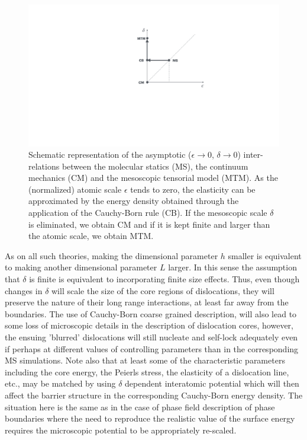\documentclass[aps,
superscriptaddress,notitlepage]{revtex4-1}
\begin{document}
 \begin{figure}[h!]
\centering
\includegraphics[width=0.25\columnwidth]{figures_ordering/figure_05.pdf}\caption{Schematic representation of the asymptotic ($\epsilon \to 0$, $\delta \to 0$) inter-relations between the molecular statics (MS), the continuum mechanics (CM) and the   mesoscopic tensorial model (MTM). As the (normalized) atomic scale $\epsilon$ tends to zero, the elasticity can be approximated by the energy density obtained through the application of the  Cauchy-Born rule (CB). If the mesoscopic scale  $\delta$ is eliminated, we obtain CM and if it is kept finite and  larger than the atomic scale, we obtain MTM.}
\label{01}
\end{figure}

As on all such theories,  making the dimensional parameter $h$ smaller is equivalent to making another dimensional parameter $L$ larger. In this sense the assumption  that $\delta$ is finite is equivalent to incorporating  finite size effects.  Thus,  even though changes in   $\delta $  will scale  the size of the core regions  of   dislocations, they  will  preserve the nature of  their long range  interactions, at least far away from the boundaries.  
 The use of Cauchy-Born coarse grained  description, will also  lead  to some  loss of   microscopic details in the description of dislocation cores,  however, the ensuing 'blurred' dislocations   will still   nucleate and self-lock adequately  even if  perhaps at different values of controlling parameters than in the corresponding MS simulations. Note also that at least some of the  characteristic   parameters including the core energy, the Peierls stress, the elasticity of a dislocation line, etc.,  may  be  matched by using $\delta$ dependent interatomic potential  which will then affect  the barrier structure in the corresponding  Cauchy-Born energy density.   The  situation here is the same as in the case of phase field description of phase boundaries where the need to reproduce  the realistic  value of the surface energy requires  the microscopic potential  to be appropriately re-scaled. 

 


 
  
\end{document}
